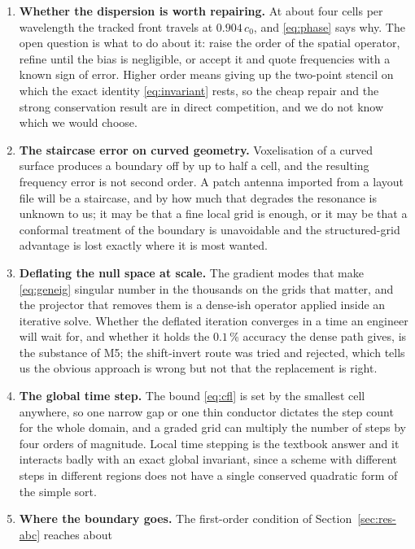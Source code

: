 \begin{enumerate}[leftmargin=1.6em,itemsep=3pt]
  \item \textbf{Whether the dispersion is worth repairing.} At about four cells per wavelength the tracked front
        travels at $0.904\,c_0$, and \eqref{eq:phase} says why. The open question is what to do about it: raise
        the order of the spatial operator, refine until the bias is negligible, or accept it and quote
        frequencies with a known sign of error. Higher order means giving up the two-point stencil on which the
        exact identity \eqref{eq:invariant} rests, so the cheap repair and the strong conservation result are in
        direct competition, and we do not know which we would choose.
  \item \textbf{The staircase error on curved geometry.} Voxelisation of a curved surface produces a boundary
        off by up to half a cell, and the resulting frequency error is not second order. A patch antenna imported
        from a layout file will be a staircase, and by how much that degrades the resonance is unknown to us; it
        may be that a fine local grid is enough, or it may be that a conformal treatment of the boundary is
        unavoidable and the structured-grid advantage is lost exactly where it is most wanted.
  \item \textbf{Deflating the null space at scale.} The gradient modes that make \eqref{eq:geneig} singular
        number in the thousands on the grids that matter, and the projector that removes them is a dense-ish
        operator applied inside an iterative solve. Whether the deflated iteration converges in a time an engineer
        will wait for, and whether it holds the $0.1$\,\% accuracy the dense path gives, is the substance of M5;
        the shift-invert route was tried and rejected, which tells us the obvious approach is wrong but not that
        the replacement is right.
  \item \textbf{The global time step.} The bound \eqref{eq:cfl} is set by the smallest cell anywhere, so one
        narrow gap or one thin conductor dictates the step count for the whole domain, and a graded grid can
        multiply the number of steps by four orders of magnitude. Local time stepping is the textbook answer and
        it interacts badly with an exact global invariant, since a scheme with different steps in different
        regions does not have a single conserved quadratic form of the simple sort.
  \item \textbf{Where the boundary goes.} The first-order condition of Section~\ref{sec:res-abc} reaches about

\end{enumerate}
